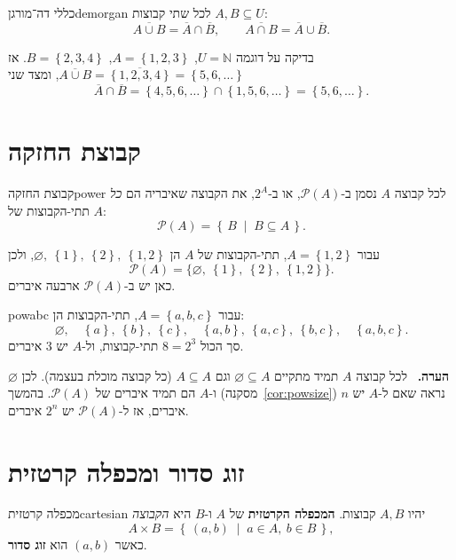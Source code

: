 \documentclass[11pt,a4paper]{report}
\newenvironment{remark}{\par\smallskip\noindent\textsf{\textbf{הערה.}}\ }{\par\smallskip}
\newcommand{\N}{\mathbb{N}}
\newcommand{\set}[1]{\left\{#1\right\}}
\newcommand{\setof}[2]{\left\{\,#1 \;\middle|\; #2\,\right\}}
\newcommand{\comp}[1]{\overline{#1}}
\newcommand{\Pow}{\mathcal{P}}
\renewcommand{\emptyset}{\varnothing}
\begin{document}
\begin{claim}{כללי דה־מורגן}{demorgan}
לכל שתי קבוצות $A,B\subseteq U$:
\[
  \comp{A\cup B}=\comp{A}\cap\comp{B},\qquad \comp{A\cap B}=\comp{A}\cup\comp{B}.
\]
\end{claim}

\begin{example}{בדיקה על דוגמה}{}
$U=\N$, $A=\set{1,2,3}$, $B=\set{2,3,4}$. אז $\comp{A\cup B}=\comp{\set{1,2,3,4}}=\set{5,6,\dots}$, ומצד שני
\[
  \comp{A}\cap\comp{B}=\set{4,5,6,\dots}\cap\set{1,5,6,\dots}=\set{5,6,\dots}.
\]
\end{example}

\section{קבוצת החזקה}

\begin{definition}{קבוצת החזקה}{power}
לכל קבוצה $A$ נסמן ב-$\Pow(A)$, או ב-$2^A$, את הקבוצה שאיבריה הם \emph{כל} תתי-הקבוצות של $A$:
\[
  \Pow(A)=\setof{B}{B\subseteq A}.
\]
\end{definition}

\begin{example}{}{}
עבור $A=\set{1,2}$, תתי-הקבוצות של $A$ הן $\emptyset,\ \set{1},\ \set{2},\ \set{1,2}$, ולכן
\[
  \Pow(A)=\big\{\emptyset,\ \set{1},\ \set{2},\ \set{1,2}\big\}.
\]
כאן יש ב-$\Pow(A)$ ארבעה איברים.
\end{example}

\begin{example}{}{powabc}
עבור $A=\set{a,b,c}$, תתי-הקבוצות הן:
\[
  \emptyset,\quad \set{a},\ \set{b},\ \set{c},\quad \set{a,b},\ \set{a,c},\ \set{b,c},\quad \set{a,b,c}.
\]
סך הכול $8=2^3$ תתי-קבוצות, ול-$A$ יש $3$ איברים.
\end{example}

\begin{remark}
לכל קבוצה $A$ תמיד מתקיים $\emptyset\subseteq A$ וגם $A\subseteq A$ (כל קבוצה מוכלת בעצמה). לכן $\emptyset$ ו-$A$ הם תמיד איברים של $\Pow(A)$.
בהמשך (מסקנה~\ref{cor:powsize}) נראה שאם ל-$A$ יש $n$ איברים, אז ל-$\Pow(A)$ יש $2^n$ איברים.
\end{remark}

\section{זוג סדור ומכפלה קרטזית}

\begin{definition}{מכפלה קרטזית}{cartesian}
יהיו $A,B$ קבוצות. \textbf{המכפלה הקרטזית} של $A$ ו-$B$ היא \emph{הקבוצה}
\[
  A\times B=\setof{(a,b)}{a\in A,\ b\in B},
\]
כאשר $(a,b)$ הוא \textbf{זוג סדור}.
\end{definition}
\end{document}
